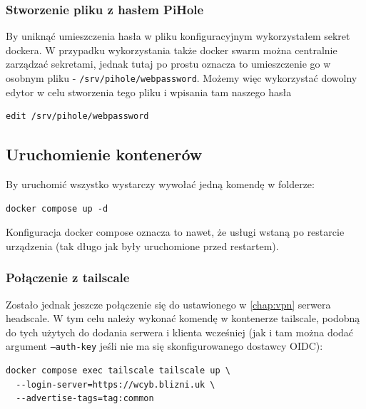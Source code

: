 \documentclass{report}
\numberwithin{equation}{section}
\begin{document}
\subsubsection{Stworzenie pliku z hasłem PiHole}
By uniknąć umieszczenia hasła w pliku konfiguracyjnym wykorzystałem sekret dockera. W przypadku wykorzystania także docker swarm można centralnie zarządzać sekretami, jednak tutaj po prostu oznacza to umieszczenie go w osobnym pliku - \texttt{/srv/pihole/webpassword}. Możemy więc wykorzystać dowolny edytor w celu stworzenia tego pliku i wpisania tam naszego hasła
\begin{verbatim}
edit /srv/pihole/webpassword
\end{verbatim}

\subsection{Uruchomienie kontenerów}
By uruchomić wszystko wystarczy wywołać jedną komendę w folderze:
\begin{verbatim}
docker compose up -d
\end{verbatim}
Konfiguracja docker compose oznacza to nawet, że usługi wstaną po restarcie urządzenia (tak długo jak były uruchomione przed restartem).
\subsubsection{Połączenie z tailscale}
Zostało jednak jeszcze połączenie się do ustawionego w \autoref{chap:vpn} serwera headscale. W tym celu należy wykonać komendę w kontenerze tailscale, podobną do tych użytych do dodania serwera i klienta wcześniej (jak i tam można dodać argument \texttt{--auth-key} jeśli nie ma się skonfigurowanego dostawcy OIDC):
\begin{verbatim}    
docker compose exec tailscale tailscale up \
  --login-server=https://wcyb.blizni.uk \
  --advertise-tags=tag:common
\end{verbatim}
\end{document}
